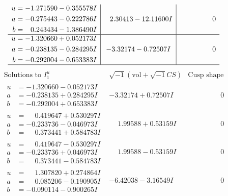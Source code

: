 \documentclass[1p]{elsarticle_modified}
\theoremstyle{definition}
\newcommand{\I}{\sqrt{-1}}
\begin{document}
$$\begin{array}{c|c|c}
\begin{aligned}
u &= -1.271590 - 0.355578 I \\
a &= -0.275443 - 0.222786 I \\
b &= \phantom{-}0.243434 - 1.386490 I\end{aligned}
 & \phantom{-}2.30413 - 12.11600 I & \phantom{-0.000000 } 0 \\ \hline\begin{aligned}
u &= -1.320660 + 0.052173 I \\
a &= -0.238135 - 0.284295 I \\
b &= -0.292004 - 0.653383 I\end{aligned}
 & -3.32174 - 0.72507 I & \phantom{-0.000000 } 0\\
 \hline 
 \end{array}$$\newpage$$\begin{array}{c|c|c}  
\text{Solutions to }I^u_{1}& \I (\text{vol} + \sqrt{-1}CS) & \text{Cusp shape}\\
 \hline 
\begin{aligned}
u &= -1.320660 - 0.052173 I \\
a &= -0.238135 + 0.284295 I \\
b &= -0.292004 + 0.653383 I\end{aligned}
 & -3.32174 + 0.72507 I & \phantom{-0.000000 } 0 \\ \hline\begin{aligned}
u &= \phantom{-}0.419647 + 0.530297 I \\
a &= -0.233736 - 0.046973 I \\
b &= \phantom{-}0.373441 + 0.584783 I\end{aligned}
 & \phantom{-}1.99588 + 0.53159 I & \phantom{-0.000000 } 0 \\ \hline\begin{aligned}
u &= \phantom{-}0.419647 - 0.530297 I \\
a &= -0.233736 + 0.046973 I \\
b &= \phantom{-}0.373441 - 0.584783 I\end{aligned}
 & \phantom{-}1.99588 - 0.53159 I & \phantom{-0.000000 } 0 \\ \hline\begin{aligned}
u &= \phantom{-}1.307820 + 0.274864 I \\
a &= \phantom{-}0.085206 - 0.190905 I \\
b &= -0.090114 - 0.900265 I\end{aligned}
 & -6.42038 - 3.16549 I & \phantom{-0.000000 } 0 \\ \hline\begin{aligned}

\end{aligned}
\end{array}$$
\end{document}

